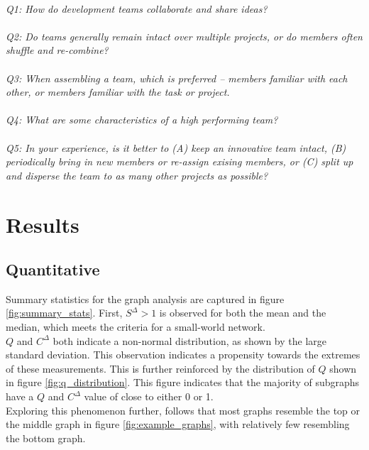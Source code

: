 \documentclass{proc}
\begin{document}
\noindent\\\textit{Q1: How do development teams collaborate and share ideas?}\\
\noindent\\\textit{Q2: Do teams generally remain intact over multiple projects, or do members often shuffle and re-combine?}\\
\noindent\\\textit{Q3: When assembling a team, which is preferred -- members familiar with each other, or members familiar with the task or project.}\\
\noindent\\\textit{Q4: What are some characteristics of a high performing team?}\\
\noindent\\\textit{Q5: In your experience, is it better to (A) keep an innovative team intact, (B) periodically bring in new members or re-assign exising members, or (C) split up and disperse the team to as many other projects as possible?}\\
 

\section{Results}

\subsection{Quantitative}



Summary statistics for the graph analysis are captured in figure \ref{fig:summary_stats}. First, $S^\Delta > 1$ is observed for both the mean and the median, which meets the criteria for a small-world network\cite{humphries2008network}.\\

$Q$ and $C^\Delta$ both indicate a non-normal distribution, as shown by the large standard deviation. This observation indicates a propensity towards the extremes of these measurements. This is further reinforced by the distribution of $Q$ shown in figure \ref{fig:q_distribution}. This figure indicates that the majority of subgraphs have a $Q$ and $C^\Delta$ value of close to either 0 or 1.\\

Exploring this phenomenon further, follows that most graphs resemble the top or the middle graph in figure \ref{fig:example_graphs}, with relatively few resembling the bottom graph.
\end{document}
